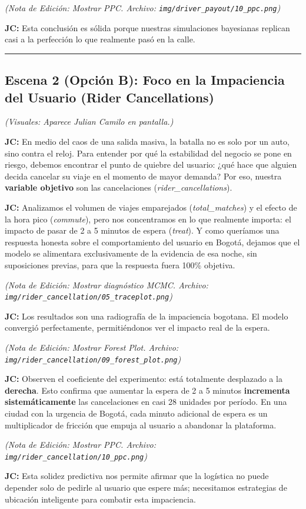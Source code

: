 \documentclass[11pt,a4paper]{article}
\begin{document}
\textit{(Nota de Edición: Mostrar PPC. Archivo: \texttt{img/driver\_payout/10\_ppc.png})}

\textbf{JC:} Esta conclusión es sólida porque nuestras simulaciones bayesianas replican casi a la perfección lo que realmente pasó en la calle.

\hrule
\vspace{0.5cm}

\subsection{Escena 2 (Opción B): Foco en la Impaciencia del Usuario (Rider Cancellations)}
\textit{(Visuales: Aparece Julian Camilo en pantalla.)}

\textbf{JC:} En medio del caos de una salida masiva, la batalla no es solo por un auto, sino contra el reloj. Para entender por qué la estabilidad del negocio se pone en riesgo, debemos encontrar el punto de quiebre del usuario: ¿qué hace que alguien decida cancelar su viaje en el momento de mayor demanda? Por eso, nuestra \textbf{variable objetivo} son las cancelaciones (\textit{rider\_cancellations}).

\textbf{JC:} Analizamos el volumen de viajes emparejados (\textit{total\_matches}) y el efecto de la hora pico (\textit{commute}), pero nos concentramos en lo que realmente importa: el impacto de pasar de 2 a 5 minutos de espera (\textit{treat}). Y como queríamos una respuesta honesta sobre el comportamiento del usuario en Bogotá, dejamos que el modelo se alimentara exclusivamente de la evidencia de esa noche, sin suposiciones previas, para que la respuesta fuera 100\% objetiva.

\textit{(Nota de Edición: Mostrar diagnóstico MCMC. Archivo: \texttt{img/rider\_cancellation/05\_traceplot.png})}

\textbf{JC:} Los resultados son una radiografía de la impaciencia bogotana. El modelo convergió perfectamente, permitiéndonos ver el impacto real de la espera.

\textit{(Nota de Edición: Mostrar Forest Plot. Archivo: \texttt{img/rider\_cancellation/09\_forest\_plot.png})}

\textbf{JC:} Observen el coeficiente del experimento: está totalmente desplazado a la \textbf{derecha}. Esto confirma que aumentar la espera de 2 a 5 minutos \textbf{incrementa sistemáticamente} las cancelaciones en casi 28 unidades por período. En una ciudad con la urgencia de Bogotá, cada minuto adicional de espera es un multiplicador de fricción que empuja al usuario a abandonar la plataforma.

\textit{(Nota de Edición: Mostrar PPC. Archivo: \texttt{img/rider\_cancellation/10\_ppc.png})}

\textbf{JC:} Esta solidez predictiva nos permite afirmar que la logística no puede depender solo de pedirle al usuario que espere más; necesitamos estrategias de ubicación inteligente para combatir esta impaciencia.
\end{document}
